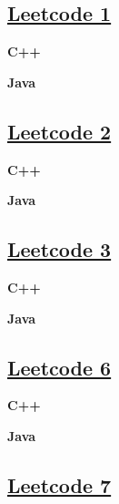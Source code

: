 \subsection{\href{https://leetcode-cn.com/}{Leetcode 1}}\label{app:codelist:leetcode:1}

\textbf{C++}\par


\textbf{Java}\par



\subsection{\href{https://leetcode-cn.com/}{Leetcode 2}}\label{app:codelist:leetcode:2}

\textbf{C++}\par


\textbf{Java}\par



\subsection{\href{https://leetcode-cn.com/}{Leetcode 3}}\label{app:codelist:leetcode:3}

\textbf{C++}\par


\textbf{Java}\par



\subsection{\href{https://leetcode-cn.com/}{Leetcode 6}}\label{app:codelist:leetcode:6}

\textbf{C++}\par


\textbf{Java}\par



\subsection{\href{https://leetcode-cn.com/}{Leetcode 7}}\label{app:codelist:leetcode:7}

